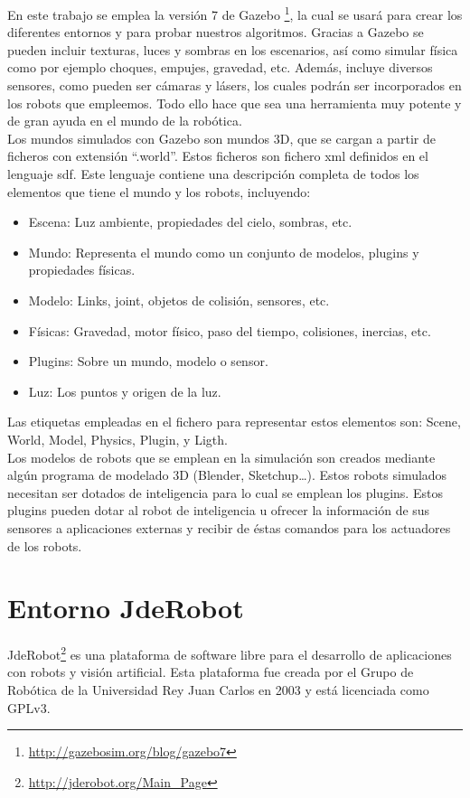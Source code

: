 En este trabajo se emplea la versión 7 de Gazebo \footnote{\url{http://gazebosim.org/blog/gazebo7}}, la cual se usará para crear los diferentes entornos y para probar nuestros algoritmos.  Gracias a Gazebo se pueden incluir texturas, luces y sombras en los escenarios, así como simular física como por ejemplo choques, empujes, gravedad, etc. Además, incluye diversos sensores, como pueden ser cámaras y lásers, los cuales podrán ser incorporados en los robots que empleemos. Todo ello hace que sea una herramienta muy potente y de gran ayuda en el mundo de la robótica.\\

Los mundos simulados con Gazebo son mundos 3D, que se cargan a partir de ficheros con extensión ``.world''. Estos ficheros son fichero \acrfull{xml} definidos en el lenguaje \acrfull{sdf}. Este lenguaje contiene una descripción completa de todos los elementos que tiene el mundo y los robots, incluyendo:

\begin{itemize}
\item Escena: Luz ambiente, propiedades del cielo, sombras, etc.
\item Mundo: Representa el mundo como un conjunto de modelos, plugins y propiedades físicas.
\item Modelo: Links, joint, objetos de colisión, sensores, etc.
\item Físicas: Gravedad, motor físico, paso del tiempo, colisiones, inercias, etc.
\item Plugins: Sobre un mundo, modelo o sensor.
\item Luz: Los puntos y origen de la luz.
\end{itemize}

Las etiquetas empleadas en el fichero para representar estos elementos son: Scene, World, Model, Physics, Plugin, y Ligth.\\

Los modelos de robots que se emplean en la simulación son creados mediante algún programa de modelado 3D (Blender, Sketchup…). Estos robots simulados necesitan ser dotados de inteligencia para lo cual se emplean los plugins. Estos plugins pueden dotar al robot de inteligencia u ofrecer la información de sus sensores a aplicaciones externas y recibir de éstas comandos para los actuadores de los robots.


\section{Entorno JdeRobot}
JdeRobot\footnote{\url{http://jderobot.org/Main_Page}} es una plataforma de software libre para el desarrollo de aplicaciones con robots y visión artificial. Esta plataforma fue creada por el Grupo de Robótica de la Universidad Rey Juan Carlos en 2003 y está licenciada como GPLv3.\\

